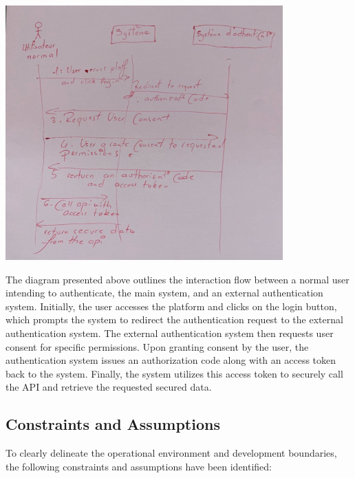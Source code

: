 \begin{center}
    \centering
    \includegraphics[width=0.8\textwidth]{Images/Analysis Sequence Diagram.jpg}
     \cite{analysis_sequence_diagram}
    \label{fig:analysis_sequence_diagram}
\end{center}

The diagram presented above outlines the interaction flow between a normal user intending to authenticate, the main system, and an external authentication system. Initially, the user accesses the platform and clicks on the login button, which prompts the system to redirect the authentication request to the external authentication system. The external authentication system then requests user consent for specific permissions. Upon granting consent by the user, the authentication system issues an authorization code along with an access token back to the system. Finally, the system utilizes this access token to securely call the API and retrieve the requested secured data.

\subsection{Constraints and Assumptions}
To clearly delineate the operational environment and development boundaries, the following constraints and assumptions have been identified:

